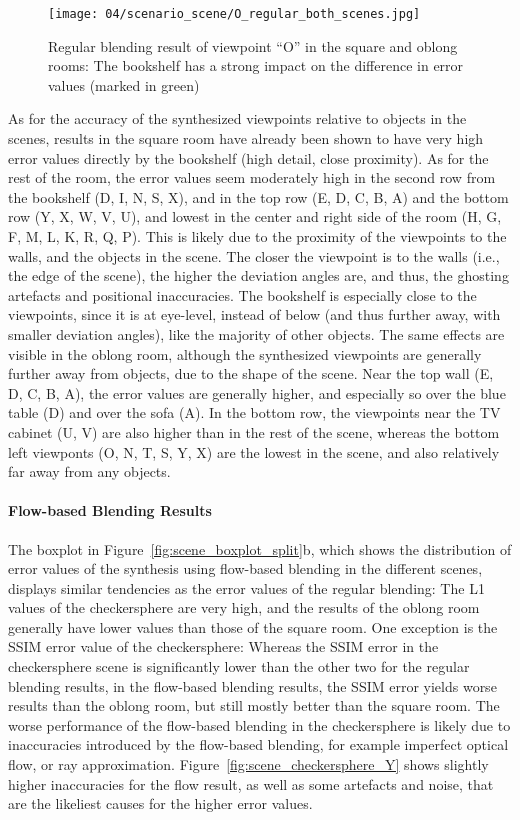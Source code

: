 \begin{figure}
		\centering
    \texttt{[image: 04/scenario\_scene/O\_regular\_both\_scenes.jpg]}
		\caption[Regular blending results of ``O'']{Regular blending result of viewpoint ``O'' in the square and oblong rooms: The bookshelf has a strong impact on the difference in error values (marked in green)}
		\label{fig:scene_O_regular}
\end{figure}

As for the accuracy of the synthesized viewpoints relative to objects in the scenes, results in the square room have already been shown to have very high error values directly by the bookshelf (high detail, close proximity). As for the rest of the room, the error values seem moderately high in the second row from the bookshelf (D, I, N, S, X), and in the top row (E, D, C, B, A) and the bottom row (Y, X, W, V, U), and lowest in the center and right side of the room (H, G, F, M, L, K, R, Q, P). This is likely due to the proximity of the viewpoints to the walls, and the objects in the scene. The closer the viewpoint is to the walls (i.e., the edge of the scene), the higher the deviation angles are, and thus, the ghosting artefacts and positional inaccuracies. The bookshelf is especially close to the viewpoints, since it is at eye-level, instead of below (and thus further away, with smaller deviation angles), like the majority of other objects.
The same effects are visible in the oblong room, although the synthesized viewpoints are generally further away from objects, due to the shape of the scene. Near the top wall (E, D, C, B, A), the error values are generally higher, and especially so over the blue table (D) and over the sofa (A). In the bottom row, the viewpoints near the TV cabinet (U, V) are also higher than in the rest of the scene, whereas the bottom left viewponts (O, N, T, S, Y, X) are the lowest in the scene, and also relatively far away from any objects.

\paragraph{Flow-based Blending Results}
The boxplot in Figure~\ref{fig:scene_boxplot_split}b, which shows the distribution of error values of the synthesis using flow-based blending in the different scenes, displays similar tendencies as the error values of the regular blending: The L1 values of the checkersphere are very high, and the results of the oblong room generally have lower values than those of the square room. One exception is the SSIM error value of the checkersphere: Whereas the SSIM error in the checkersphere scene is significantly lower than the other two for the regular blending results, in the flow-based blending results, the SSIM error yields worse results than the oblong room, but still mostly better than the square room. The worse performance of the flow-based blending in the checkersphere is likely due to inaccuracies introduced by the flow-based blending, for example imperfect optical flow, or ray approximation. Figure~\ref{fig:scene_checkersphere_Y} shows slightly higher inaccuracies for the flow result, as well as some artefacts and noise, that are the likeliest causes for the higher error values.

